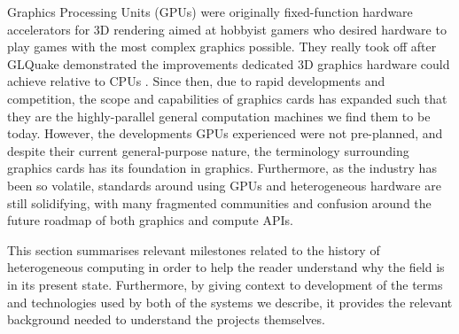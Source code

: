 \documentclass[a4paper,12pt,twoside,openright]{report}
\begin{document}
\label{sec:history_gpu}

Graphics Processing Units (GPUs) were originally fixed-function hardware
accelerators for 3D rendering aimed at hobbyist gamers who desired hardware to
play games with the most complex graphics possible. They really took off after
GLQuake demonstrated the improvements dedicated 3D graphics hardware could
achieve relative to CPUs \cite{GLQuake}. Since then, due to rapid developments
and competition, the scope and capabilities of graphics cards has expanded such
that they are the highly-parallel general computation machines we find them to
be today. However, the developments GPUs experienced were not pre-planned, and
despite their current general-purpose nature, the terminology surrounding
graphics cards has its foundation in graphics. Furthermore, as the industry has
been so volatile, standards around using GPUs and heterogeneous hardware are
still solidifying, with many fragmented communities and confusion around the
future roadmap of both graphics and compute APIs.

This section summarises relevant milestones related to the history of
heterogeneous computing in order to help the reader understand why the field is
in its present state. Furthermore, by giving context to development of the
terms and technologies used by both of the systems we describe, it provides the
relevant background needed to understand the projects themselves.

\end{document}
